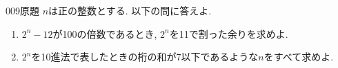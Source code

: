 \begin{prob}{009}{}{原題}
$n$は正の整数とする. 以下の問に答えよ.
    \begin{enumerate}
        \item $2^n-12$が100の倍数であるとき, $2^n$を11で割った余りを求めよ.
        \item $2^n$を10進法で表したときの桁の和が7以下であるような$n$をすべて求めよ.
    \end{enumerate}
\end{prob}
